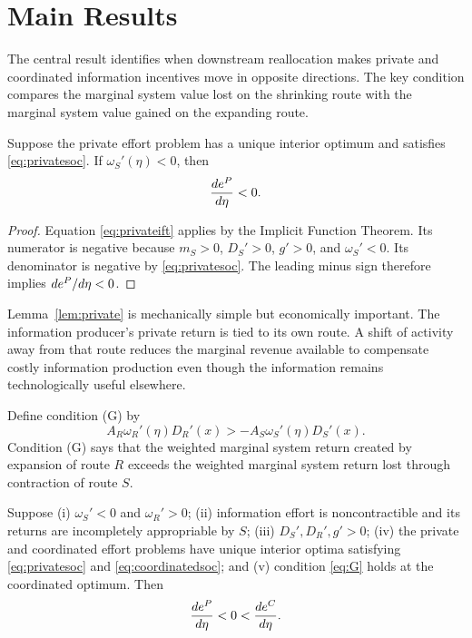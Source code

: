 \section{Main Results}\label{sec:mainresults}

The central result identifies when downstream reallocation makes private and coordinated information incentives move in opposite directions. The key condition compares the marginal system value lost on the shrinking route with the marginal system value gained on the expanding route.

\begin{lemma}\label{lem:private}
Suppose the private effort problem has a unique interior optimum and satisfies \eqref{eq:privatesoc}. If $\omega_S'(\eta)<0$, then
\[
    \frac{de^{P}}{d\eta}<0.
\]
\end{lemma}

\begin{proof}
Equation \eqref{eq:privateift} applies by the Implicit Function Theorem. Its numerator is negative because $m_S>0$, $D_S'>0$, $g'>0$, and $\omega_S'<0$. Its denominator is negative by \eqref{eq:privatesoc}. The leading minus sign therefore implies $de^{P}/d\eta<0$.
\end{proof}

Lemma~\ref{lem:private} is mechanically simple but economically important. The information producer's private return is tied to its own route. A shift of activity away from that route reduces the marginal revenue available to compensate costly information production even though the information remains technologically useful elsewhere.

Define condition (G) by
\begin{equation}
    A_R\omega_R'(\eta)D_R'(x)
    >-A_S\omega_S'(\eta)D_S'(x).
    \tag{G}\label{eq:G}
\end{equation}
Condition (G) says that the weighted marginal system return created by expansion of route $R$ exceeds the weighted marginal system return lost through contraction of route $S$.

\begin{theorem}\label{thm:divergence}
Suppose (i) $\omega_S'<0$ and $\omega_R'>0$; (ii) information effort is noncontractible and its returns are incompletely appropriable by $S$; (iii) $D_S',D_R',g'>0$; (iv) the private and coordinated effort problems have unique interior optima satisfying \eqref{eq:privatesoc} and \eqref{eq:coordinatedsoc}; and (v) condition \eqref{eq:G} holds at the coordinated optimum. Then
\begin{equation}
    \frac{de^{P}}{d\eta}<0<\frac{de^{C}}{d\eta}.
    \label{eq:divergence}
\end{equation}
\end{theorem}

